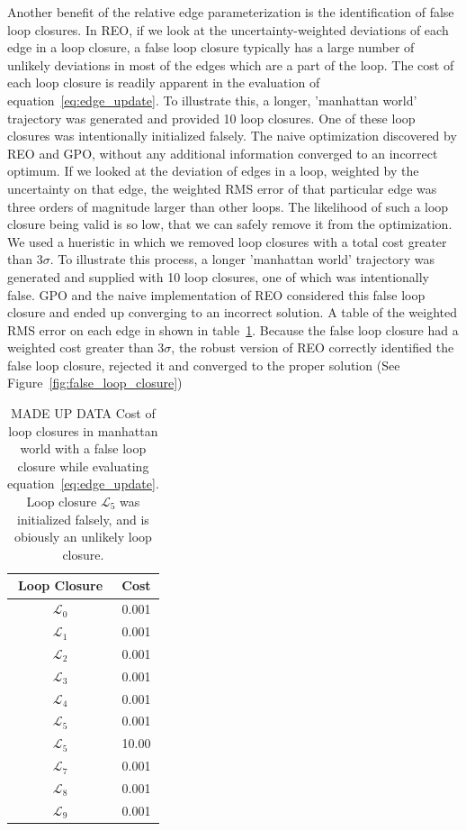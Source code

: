 Another benefit of the relative edge parameterization is the identification of false loop closures.  In REO, if we look at the uncertainty-weighted deviations of each edge in a loop closure, a false loop closure typically has a large number of unlikely deviations in most of the edges which are a part of the loop.   The cost of each loop closure is readily apparent in the evaluation of equation~\ref{eq:edge_update}. To illustrate this, a longer, 'manhattan world' trajectory was generated and provided 10 loop closures.  One of these loop closures was intentionally initialized falsely.  The naive optimization discovered by REO and GPO, without any additional information converged to an incorrect optimum.  If we looked at the deviation of edges in a loop, weighted by the uncertainty on that edge, the weighted RMS error of that particular edge was three orders of magnitude larger than other loops.  The likelihood of such a loop closure being valid is so low, that we can safely remove it from the optimization.  We used a hueristic in which we removed loop closures with a total cost greater than $3\sigma$.  To illustrate this process, a longer 'manhattan world' trajectory was generated and supplied with 10 loop closures, one of which was intentionally false.  GPO and the naive implementation of REO considered this false loop closure and ended up converging to an incorrect solution.  A table of the weighted RMS error on each edge in shown in table~\ref{tab:false_loop_closure}.  Because the false loop closure had a weighted cost greater than $3\sigma$, the robust version of REO correctly identified the false loop closure, rejected it and converged to the proper solution (See Figure~\ref{fig:false_loop_closure})
\begin{table}
  \begin{center}
    \begin{tabular}{|c|c|}
      \hline
      Loop Closure & Cost \\ \hline
      $\mathcal{L}_0$ & 0.001 \\ \hline
      $\mathcal{L}_1$ & 0.001 \\ \hline
      $\mathcal{L}_2$ & 0.001 \\ \hline
      $\mathcal{L}_3$ & 0.001 \\ \hline
      $\mathcal{L}_4$ & 0.001 \\ \hline
      $\mathcal{L}_5$ & 0.001 \\ \hline
      $\mathcal{L}_5$ & 10.00 \\ \hline
      $\mathcal{L}_7$ & 0.001 \\ \hline
      $\mathcal{L}_8$ & 0.001 \\ \hline
      $\mathcal{L}_9$ & 0.001 \\ \hline
    \end{tabular}
  \end{center}
  \caption{ MADE UP DATA Cost of loop closures in manhattan world with a false loop closure while evaluating equation~\ref{eq:edge_update}.  Loop closure $\mathcal{L}_5$ was initialized falsely, and is obiously an unlikely loop closure.}
  \label{tab:false_loop_closure}
\end{table}


